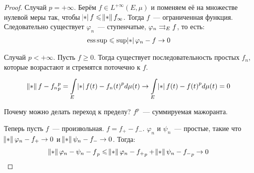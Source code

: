 \begin{proof}
    Случай $p = +\infty$.
    Берём $f \in L^{+\infty}(E, \mu)$ и поменяем её на множестве нулевой
    меры так, чтобы $\abs f \le \norm f_\infty$. Тогда $f$~--- ограниченная функция.
    Следовательно существует $\varphi_n$~--- ступенчатые,
    $\varphi_n \rightrightarrows_E f$, то есть:
    \begin{gather*}
        \esssup \le \sup \abs{\varphi_n - f} \to 0
    \end{gather*}

    Случай $p < +\infty$.
    Пусть $f \ge 0$. Тогда существует последовательность простых
    $f_n$, которые возрастают и стремятся поточечно к $f$.

    \[
        \norm{f - f_n}^p_p = \int\limits_E \abs{f(t) - f_n(t)}^p d\mu(t)
        \to \int\limits_E \abs{f(t) - f(t)}^p d\mu(t) = 0
    \]

    Почему можно делать переход к пределу?
    $f^p$~--- суммируемая мажоранта.

    Теперь пусть $f$~--- произвольная.
    $f = f_+ - f_-$.
    $\varphi_n$ и $\psi_n$~--- простые, такие что
    $\norm{\varphi_n - f_+} \to 0$ и $\norm{\psi_n - f_-} \to 0$.
    Тогда:
    \begin{gather*}
        \norm{\varphi_n - \psi_n - f}_p \le \norm{\varphi_n - f_+}_p + \norm{\psi_n - f_-}_p \to 0
    \end{gather*}
\end{proof}

\newpage

